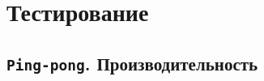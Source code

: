 \documentclass[t]{beamer}  %
\begin{document}
\begin{frame}[fragile]
\begin{figure}[H]
	\end{figure}
 \end{frame}

 \section{Тестирование}
 \subsection{\texttt{Ping-pong}. Производительность}
\end{document}
